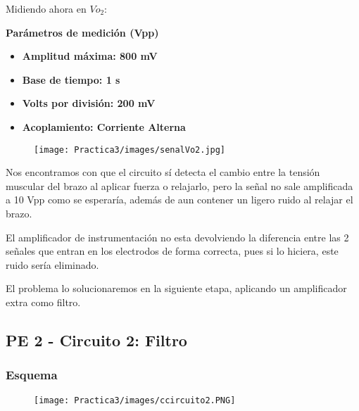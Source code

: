 \documentclass[12pt]{article}
\begin{document}
        
        
        Midiendo ahora en $Vo_{2}$:
        
        \textbf{Parámetros de medición (Vpp)}
            \begin{multicols}{2}
                \begin{itemize}
                    \item[\checkmark] \textbf{Amplitud máxima: 800 mV}
                    \item[\checkmark] \textbf{Base de tiempo: 1 s}
            \columnbreak
                    \item[\checkmark] \textbf{Volts por división: 200 mV}
                    \item[\checkmark] \textbf{Acoplamiento: Corriente Alterna}
                \end{itemize}
            \end{multicols}
        
	        \begin{figure}[h!]
                \centering
                \texttt{[image: Practica3/images/senalVo2.jpg]}
            \end{figure}
        
        Nos encontramos con que el circuito sí detecta el cambio entre la tensión muscular del brazo al aplicar fuerza o relajarlo, pero la señal no sale amplificada a 10 Vpp como se esperaría, además de aun contener un ligero ruido al relajar el brazo. 
        
        El amplificador de instrumentación no esta devolviendo la diferencia entre las 2 señales que entran en los electrodos de forma correcta, pues si lo hiciera, este ruido sería eliminado.
        
        El problema lo solucionaremos en la siguiente etapa, aplicando un amplificador extra como filtro.

	\subsection{PE 2 - Circuito 2: Filtro}
		\subsubsection{Esquema}
	\begin{figure}[h!]
                \centering
                \texttt{[image: Practica3/images/ccircuito2.PNG]}
    \end{figure} 
\end{document}
